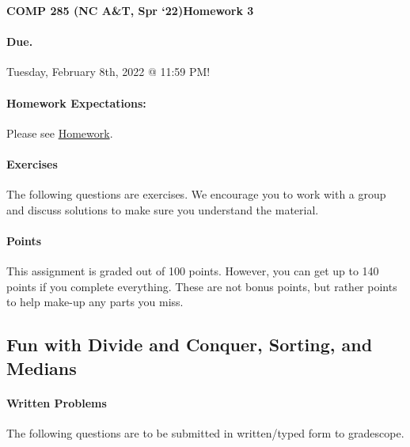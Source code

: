 \documentclass [12pt]{article}
\begin{document}
 

{\LARGE \textbf {COMP 285 (NC A\&T, Spr `22)}\hfill \textbf {Homework 3} } 
\vspace {1em} 
\begin {Instruction} 

\paragraph {Due.} Tuesday, February 8th, 2022 @ 11:59 PM!
\end {Instruction} 

\vspace {1em} 
\begin {Instruction} \paragraph {Homework Expectations:} Please see \href{https://www.comp285.ml/homework/#general-homework-information}{Homework}.
\end {Instruction}

\vspace {1em} 
\begin {Instruction} 

\paragraph {Exercises} The following questions are exercises. We encourage you to work with a group and discuss solutions to make sure you understand the material.

\paragraph {Points} This assignment is graded out of 100 points. However, you can get up to 140 points if you complete everything. These are not bonus points, but rather points to help make-up any parts you miss.

\end {Instruction} 

\begin{centering}
\section*{Fun with Divide and Conquer, Sorting, and Medians}
\end{centering}

\begin{Instruction}

\paragraph{Written Problems} The following questions are to be submitted in written/typed form to gradescope.

\end{Instruction}
\end{document}
